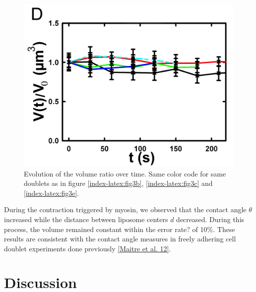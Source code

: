 \documentclass[A4paperpaper,11pt,english]{sphinxmanual}
\begin{document}
\begin{figure}[htbp]
\centering
\capstart

\includegraphics[width=0.500\linewidth]{Fig_03-D.png}
\caption{Evolution of the volume ratio over time.
Same color code for same doublets as in figure \hyperref[index-latex:fig3b]{ \ref*{index-latex:fig3b}}, \hyperref[index-latex:fig3c]{ \ref*{index-latex:fig3c}}
and \hyperref[index-latex:fig3e]{ \ref*{index-latex:fig3e}}.}\label{index-latex:fig3d}\end{figure}

During the contraction triggered by myosin, we observed that the contact angle
\(\theta\) increased while the distance between liposome centers \(d\) decreased.
During this process, the volume remained constant within the error rate? of 10\%.  These
results are consistent with the contact angle measures in freely adhering cell
doublet experiments done previously {\hyperref[index-latex:maitre2012]{{[}Maitre et al. 12{]}}}.


\section{Discussion}
\label{index-latex:discussion}
\end{document}
